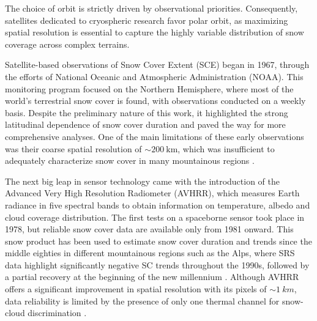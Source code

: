 The choice of orbit is strictly driven by observational priorities. Consequently, satellites dedicated to cryospheric research favor polar orbit, as
maximizing spatial resolution is essential to capture the highly variable distribution of snow coverage across complex terrains. 

Satellite-based observations of Snow Cover Extent (SCE) began in 1967, through the efforts of National Oceanic and Atmospheric Administration (NOAA). 
This monitoring program focused on the Northern Hemisphere, where most of the world's terrestrial snow cover is found, with observations conducted 
on a weekly basis. Despite the preliminary nature of this work, it highlighted the strong latitudinal dependence of snow cover duration and paved 
the way for more comprehensive analyses. One of the main limitations of these early observations was their coarse spatial resolution of 
$\sim \SI{200}{\km}$, which was insufficient to adequately characterize snow cover in many mountainous regions \parencite{NOAA_first_SRS}. 


The next big leap in sensor technology came with the introduction of the Advanced Very High Resolution Radiometer (AVHRR), which measures Earth radiance  
in five spectral bands to obtain information on temperature, albedo and cloud coverage distribution. The first tests on a spaceborne sensor took place
in 1978, but reliable snow cover data are available only from 1981 onward. This snow product has been used to estimate snow cover duration and trends 
since the middle eighties in different mountainous regions such as the Alps, where SRS data highlight significantly negative SC trends throughout 
the 1990s, followed by a partial recovery at the beginning of the new millennium \parencite{AVHRR_example}. Although AVHRR offers a significant 
improvement in spatial resolution with its pixels of $\sim \SI{1}{km}$, data reliability is limited by the presence of only one thermal channel for 
snow-cloud discrimination \parencite{MODIS_GAR}.